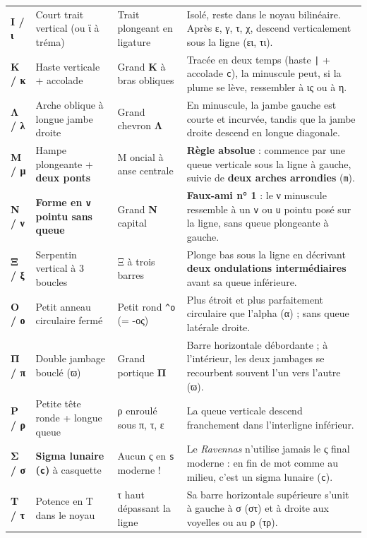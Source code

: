 \documentclass[11pt,a4paper]{article}
\begin{document}
\begin{longtable}{@{}p{1.6cm}p{3.8cm}p{3.4cm}p{7.2cm}@{}}
\addlinespace
\textbf{Ι / ι} & Court trait vertical (ou ϊ à tréma) & Trait plongeant en ligature & Isolé, reste dans le noyau bilinéaire. Après ε, γ, τ, χ, descend verticalement sous la ligne (ει, τι). \\
\addlinespace
\textbf{Κ / κ} & Haste verticale + accolade & Grand \textbf{Κ} à bras obliques & Tracée en deux temps (haste \texttt{|} + accolade \texttt{c}), la minuscule peut, si la plume se lève, ressembler à ις ou à η. \\
\addlinespace
\textbf{Λ / λ} & Arche oblique à longue jambe droite & Grand chevron \textbf{Λ} & En minuscule, la jambe gauche est courte et incurvée, tandis que la jambe droite descend en longue diagonale. \\
\addlinespace
\textbf{Μ / μ} & Hampe plongeante + \textbf{deux ponts} & Μ oncial à anse centrale & \textbf{Règle absolue} : commence par une queue verticale sous la ligne à gauche, suivie de \textbf{deux arches arrondies} (\texttt{m}). \\
\addlinespace
\textbf{Ν / ν} & \textbf{Forme en \texttt{v} pointu sans queue} & Grand \textbf{Ν} capital & \textbf{Faux-ami n° 1} : le ν minuscule ressemble à un \texttt{v} ou \texttt{u} pointu posé sur la ligne, sans queue plongeante à gauche. \\
\addlinespace
\textbf{Ξ / ξ} & Serpentin vertical à 3 boucles & Ξ à trois barres & Plonge bas sous la ligne en décrivant \textbf{deux ondulations intermédiaires} avant sa queue inférieure. \\
\addlinespace
\textbf{Ο / ο} & Petit anneau circulaire fermé & Petit rond \texttt{\^{}ο} (= -ος) & Plus étroit et plus parfaitement circulaire que l'alpha (α) ; sans queue latérale droite. \\
\addlinespace
\textbf{Π / π} & Double jambage bouclé (ϖ) & Grand portique \textbf{Π} & Barre horizontale débordante ; à l'intérieur, les deux jambages se recourbent souvent l'un vers l'autre (ϖ). \\
\addlinespace
\textbf{Ρ / ρ} & Petite tête ronde + longue queue & ρ enroulé sous π, τ, ε & La queue verticale descend franchement dans l'interligne inférieur. \\
\addlinespace
\textbf{Σ / σ} & \textbf{Sigma lunaire (\texttt{c})} à casquette & Aucun ς en \texttt{s} moderne ! & Le \textit{Ravennas} n'utilise jamais le ς final moderne : en fin de mot comme au milieu, c'est un sigma lunaire (\texttt{c}). \\
\addlinespace
\textbf{Τ / τ} & Potence en Τ dans le noyau & τ haut dépassant la ligne & Sa barre horizontale supérieure s'unit à gauche à σ (στ) et à droite aux voyelles ou au ρ (τρ). \\

\end{longtable}
\end{document}
